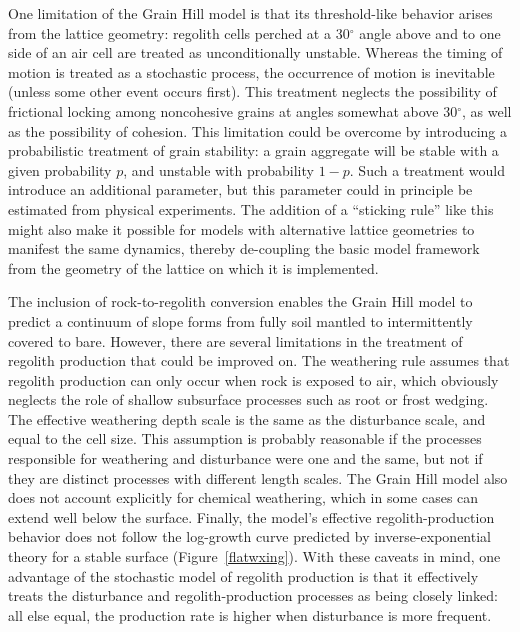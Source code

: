 \documentclass[esurf, manuscript]{copernicus}
\begin{document}
One limitation of the Grain Hill model is that its threshold-like behavior arises from the lattice geometry: regolith cells perched at a 30$^\circ$ angle above and to one side of an air cell are treated as unconditionally unstable. Whereas the timing of motion is treated as a stochastic process, the occurrence of motion is inevitable (unless some other event occurs first). This treatment neglects the possibility of frictional locking among noncohesive grains at angles somewhat above 30$^\circ$, 
as well as the possibility of cohesion. This limitation could be overcome by introducing a probabilistic treatment of grain stability: a grain aggregate will be stable with a given probability $p$, and unstable with probability $1-p$. Such a treatment would introduce an additional parameter, but this parameter could in principle be estimated from physical experiments. The addition of a ``sticking rule'' like this might also make it possible for models with alternative lattice geometries to manifest the same dynamics, thereby de-coupling the basic model framework from the geometry of the lattice on which it is implemented.

The inclusion of rock-to-regolith conversion enables the Grain Hill model to predict a continuum of slope forms from fully soil mantled to intermittently covered to bare. However, there are several limitations in the treatment of regolith production that could be improved on. The weathering rule assumes that regolith production can only occur when rock is exposed to air, which obviously neglects the role of shallow subsurface processes such as root or frost wedging. The effective weathering depth scale is the same as the disturbance scale, and equal to the cell size. This assumption is probably reasonable if the processes responsible for weathering and disturbance were one and the same, but not if they are distinct processes with different length scales. The Grain Hill model also does not account explicitly for chemical weathering, which in some cases can extend well below the surface. Finally, the model's effective regolith-production behavior does not follow the log-growth curve predicted by inverse-exponential theory for a stable surface (Figure~\ref{flatwxing}). With these caveats in mind, one advantage of the stochastic model of regolith production is that it effectively treats the disturbance and regolith-production processes as being closely linked: all else equal, the production rate is higher when disturbance is more frequent.
\end{document}
